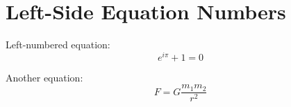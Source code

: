 \documentclass[leqno]{article}
\begin{document}
\section*{Left-Side Equation Numbers}

Left-numbered equation:
\begin{equation}
e^{i\pi} + 1 = 0
\end{equation}

Another equation:
\begin{equation}
F = G\frac{m_1 m_2}{r^2}
\end{equation}
\end{document}
